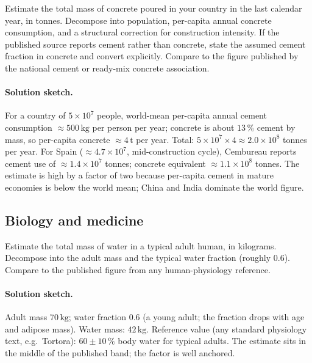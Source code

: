 \begin{exercise}
Estimate the total mass of concrete poured in your country in the
last calendar year, in tonnes. Decompose into population, per-capita
annual concrete consumption, and a structural correction for
construction intensity. If the published source reports cement
rather than concrete, state the assumed cement fraction in concrete
and convert explicitly. Compare to the figure published by the
national cement or ready-mix concrete association.
\end{exercise}

\paragraph{Solution sketch.}
For a country of $5 \times 10^{7}$ people, world-mean per-capita
annual cement consumption $\approx 500 \,\si{\kilo\gram}$ per
person per year; concrete is about $13\,\%$ cement by mass, so
per-capita concrete $\approx 4 \,\si{\tonne}$ per year. Total:
$5 \times 10^{7} \times 4 \approx 2.0 \times 10^{8}$ tonnes per
year. For Spain ($\approx 4.7 \times 10^{7}$, mid-construction
cycle), Cembureau reports cement use of $\approx 1.4 \times 10^{7}$
tonnes; concrete equivalent $\approx 1.1 \times 10^{8}$ tonnes.
The estimate is high by a factor of two because per-capita cement
in mature economies is below the world mean; China and India
dominate the world figure.

\subsection*{Biology and medicine}

\begin{exercise}
Estimate the total mass of water in a typical adult human, in
kilograms. Decompose into the adult mass and the typical water
fraction (roughly $0.6$). Compare to the published figure from any
human-physiology reference.
\end{exercise}

\paragraph{Solution sketch.}
Adult mass $70 \,\si{\kilo\gram}$; water fraction $0.6$ (a young
adult; the fraction drops with age and adipose mass). Water mass:
$42 \,\si{\kilo\gram}$. Reference value (any standard physiology
text, e.g.\ Tortora): $60 \pm 10 \,\%$ body water for typical
adults. The estimate sits in the middle of the published band; the
factor is well anchored.

